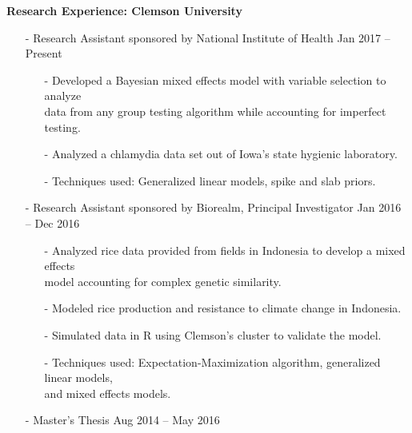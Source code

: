 \documentclass[10pt]{article}
\begin{document}
\noindent
\textbf{Research Experience: Clemson University}
\begin{itemize}
\item[-] Research Assistant sponsored by National Institute of Health \hfill Jan 2017 -- Present

\vspace{-0.25cm}

\begin{itemize}
\item[-] Developed a Bayesian mixed effects model with variable selection to analyze \\ data 
from any group testing algorithm while accounting for imperfect testing.

\vspace{-0.05cm}

\item[-] Analyzed a chlamydia data set out of Iowa's state hygienic laboratory.

\vspace{-0.05cm}

\item[-] Techniques used: Generalized linear models, spike and slab priors.
\end{itemize}
\item[-] Research Assistant sponsored by Biorealm, Principal Investigator \hfill Jan 2016 -- Dec 2016
\begin{itemize}

\vspace{-0.25cm}

\item[-] Analyzed rice data provided from fields in Indonesia to develop a mixed effects \\ model accounting for complex genetic similarity.

\vspace{-0.05cm}

\item[-] Modeled rice production and resistance to climate change in Indonesia.

\vspace{-0.05cm}

\item[-] Simulated data in R using Clemson's cluster to validate the model.

\vspace{-0.05cm}

\item[-] Techniques used: Expectation-Maximization algorithm, generalized linear models, \\ and mixed effects models.
\end{itemize}
\item[-] Master's Thesis \hfill Aug 2014 -- May 2016
\begin{itemize}


\end{itemize}
\end{itemize}
\end{document}
